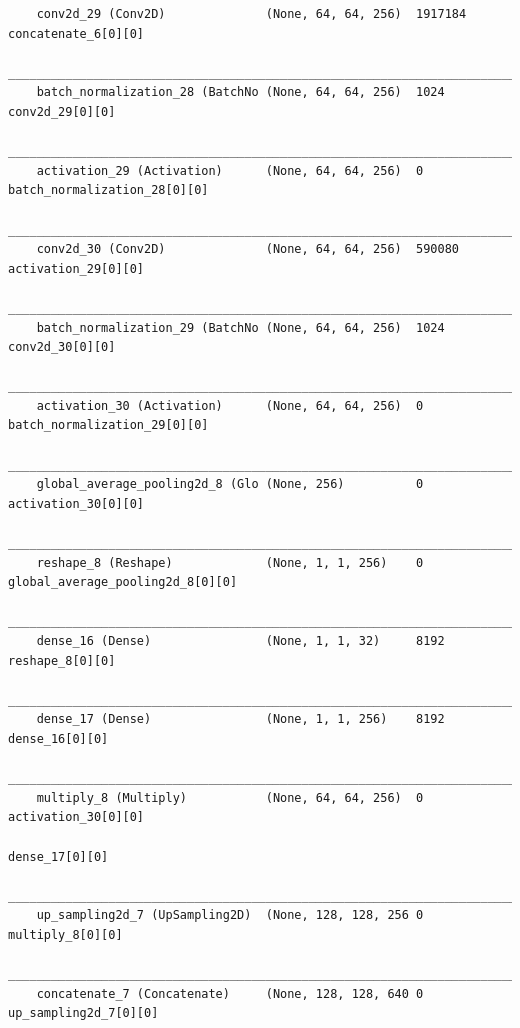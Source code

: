 {\begin{verbatim}
    conv2d_29 (Conv2D)              (None, 64, 64, 256)  1917184     concatenate_6[0][0]              
    __________________________________________________________________________________________________
    batch_normalization_28 (BatchNo (None, 64, 64, 256)  1024        conv2d_29[0][0]                  
    __________________________________________________________________________________________________
    activation_29 (Activation)      (None, 64, 64, 256)  0           batch_normalization_28[0][0]     
    __________________________________________________________________________________________________
    conv2d_30 (Conv2D)              (None, 64, 64, 256)  590080      activation_29[0][0]              
    __________________________________________________________________________________________________
    batch_normalization_29 (BatchNo (None, 64, 64, 256)  1024        conv2d_30[0][0]                  
    __________________________________________________________________________________________________
    activation_30 (Activation)      (None, 64, 64, 256)  0           batch_normalization_29[0][0]     
    __________________________________________________________________________________________________
    global_average_pooling2d_8 (Glo (None, 256)          0           activation_30[0][0]              
    __________________________________________________________________________________________________
    reshape_8 (Reshape)             (None, 1, 1, 256)    0           global_average_pooling2d_8[0][0] 
    __________________________________________________________________________________________________
    dense_16 (Dense)                (None, 1, 1, 32)     8192        reshape_8[0][0]                  
    __________________________________________________________________________________________________
    dense_17 (Dense)                (None, 1, 1, 256)    8192        dense_16[0][0]                   
    __________________________________________________________________________________________________
    multiply_8 (Multiply)           (None, 64, 64, 256)  0           activation_30[0][0]              
                                                                        dense_17[0][0]                   
    __________________________________________________________________________________________________
    up_sampling2d_7 (UpSampling2D)  (None, 128, 128, 256 0           multiply_8[0][0]                 
    __________________________________________________________________________________________________
    concatenate_7 (Concatenate)     (None, 128, 128, 640 0           up_sampling2d_7[0][0]            

\end{verbatim}}
